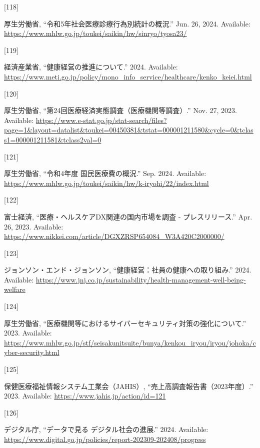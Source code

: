 \documentclass[
  a4paper,
  a4paper,
  11pt]{ltjsbook}
\newlength{\cslhangindent}
\newlength{\csllabelwidth}
\newenvironment{CSLReferences}[2] %
 {\begin{list}{}{%
  \setlength{\itemindent}{0pt}
  \setlength{\leftmargin}{0pt}
  \setlength{\parsep}{0pt}
  \ifodd #1
   \setlength{\leftmargin}{\cslhangindent}
   \setlength{\itemindent}{-1\cslhangindent}
  \fi
  \setlength{\itemsep}{#2\baselineskip}}}
 {\end{list}}
\newcommand{\CSLLeftMargin}[1]{\parbox[t]{\csllabelwidth}{\strut#1\strut}}
\newcommand{\CSLRightInline}[1]{\parbox[t]{\linewidth - \csllabelwidth}{\strut#1\strut}}
\begin{document}
\begin{CSLReferences}{0}{0}
\CSLLeftMargin{{[}118{]} }%
\CSLRightInline{厚生労働省, {``令和5年社会医療診療行為別統計の概況.''}
Jun. 26, 2024. Available:
\url{https://www.mhlw.go.jp/toukei/saikin/hw/sinryo/tyosa23/}}

\CSLLeftMargin{{[}119{]} }%
\CSLRightInline{経済産業省, {``健康経営の推進について.''} 2024.
Available:
\url{https://www.meti.go.jp/policy/mono_info_service/healthcare/kenko_keiei.html}}

\CSLLeftMargin{{[}120{]} }%
\CSLRightInline{厚生労働省,
{``第24回医療経済実態調査（医療機関等調査）.''} Nov. 27, 2023.
Available:
\url{https://www.e-stat.go.jp/stat-search/files?page=1&layout=datalist&toukei=00450381&tstat=000001211580&cycle=0&tclass1=000001211581&tclass2val=0}}

\CSLLeftMargin{{[}121{]} }%
\CSLRightInline{厚生労働省, {``令和4年度 国民医療費の概況.''} Sep. 2024.
Available:
\url{https://www.mhlw.go.jp/toukei/saikin/hw/k-iryohi/22/index.html}}

\CSLLeftMargin{{[}122{]} }%
\CSLRightInline{富士経済, {``医療・ヘルスケアDX関連の国内市場を調査 -
プレスリリース.''} Apr. 26, 2023. Available:
\url{https://www.nikkei.com/article/DGXZRSP654084_W3A420C2000000/}}

\CSLLeftMargin{{[}123{]} }%
\CSLRightInline{ジョンソン・エンド・ジョンソン,
{``健康経営：社員の健康への取り組み.''} 2024. Available:
\url{https://www.jnj.co.jp/sustainability/health-management-well-being-welfare}}

\CSLLeftMargin{{[}124{]} }%
\CSLRightInline{厚生労働省,
{``医療機関等におけるサイバーセキュリティ対策の強化について.''} 2023.
Available:
\url{https://www.mhlw.go.jp/stf/seisakunitsuite/bunya/kenkou_iryou/iryou/johoka/cyber-security.html}}

\CSLLeftMargin{{[}125{]} }%
\CSLRightInline{保健医療福祉情報システム工業会（JAHIS）,
{``売上高調査報告書（2023年度）.''} 2023. Available:
\url{https://www.jahis.jp/action/id=121}}

\CSLLeftMargin{{[}126{]} }%
\CSLRightInline{デジタル庁, {``データで見る デジタル社会の進展.''} 2024.
Available:
\url{https://www.digital.go.jp/policies/report-202309-202408/progress}}


\end{CSLReferences}
\end{document}
